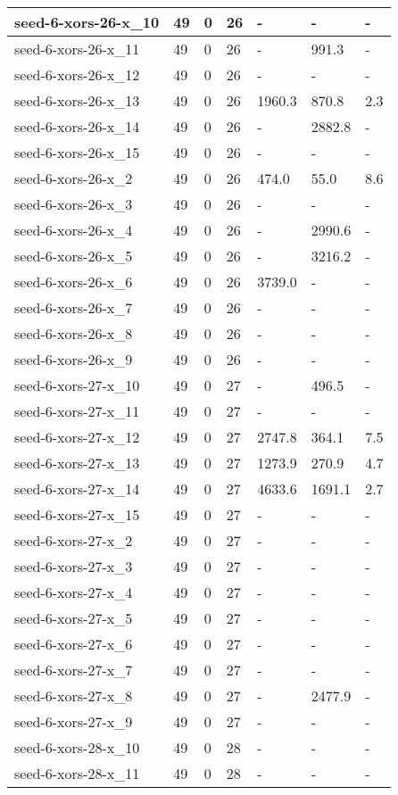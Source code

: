 \begin{scriptsize}
\begin{longtable}{|p{5cm}|l|l|l|l|l|l|}
seed-6-xors-26-x\_10&49&0&26&-&-&- \\ \hline 
seed-6-xors-26-x\_11&49&0&26&-&991.3&- \\ \hline 
seed-6-xors-26-x\_12&49&0&26&-&-&- \\ \hline 
seed-6-xors-26-x\_13&49&0&26&1960.3&870.8&2.3 \\ \hline 
seed-6-xors-26-x\_14&49&0&26&-&2882.8&- \\ \hline 
seed-6-xors-26-x\_15&49&0&26&-&-&- \\ \hline 
seed-6-xors-26-x\_2&49&0&26&474.0&55.0&8.6 \\ \hline 
seed-6-xors-26-x\_3&49&0&26&-&-&- \\ \hline 
seed-6-xors-26-x\_4&49&0&26&-&2990.6&- \\ \hline 
seed-6-xors-26-x\_5&49&0&26&-&3216.2&- \\ \hline 
seed-6-xors-26-x\_6&49&0&26&3739.0&-&- \\ \hline 
seed-6-xors-26-x\_7&49&0&26&-&-&- \\ \hline 
seed-6-xors-26-x\_8&49&0&26&-&-&- \\ \hline 
seed-6-xors-26-x\_9&49&0&26&-&-&- \\ \hline 
seed-6-xors-27-x\_10&49&0&27&-&496.5&- \\ \hline 
seed-6-xors-27-x\_11&49&0&27&-&-&- \\ \hline 
seed-6-xors-27-x\_12&49&0&27&2747.8&364.1&7.5 \\ \hline 
seed-6-xors-27-x\_13&49&0&27&1273.9&270.9&4.7 \\ \hline 
seed-6-xors-27-x\_14&49&0&27&4633.6&1691.1&2.7 \\ \hline 
seed-6-xors-27-x\_15&49&0&27&-&-&- \\ \hline 
seed-6-xors-27-x\_2&49&0&27&-&-&- \\ \hline 
seed-6-xors-27-x\_3&49&0&27&-&-&- \\ \hline 
seed-6-xors-27-x\_4&49&0&27&-&-&- \\ \hline 
seed-6-xors-27-x\_5&49&0&27&-&-&- \\ \hline 
seed-6-xors-27-x\_6&49&0&27&-&-&- \\ \hline 
seed-6-xors-27-x\_7&49&0&27&-&-&- \\ \hline 
seed-6-xors-27-x\_8&49&0&27&-&2477.9&- \\ \hline 
seed-6-xors-27-x\_9&49&0&27&-&-&- \\ \hline 
seed-6-xors-28-x\_10&49&0&28&-&-&- \\ \hline 
seed-6-xors-28-x\_11&49&0&28&-&-&- \\ \hline 

\end{longtable}
\end{scriptsize}
